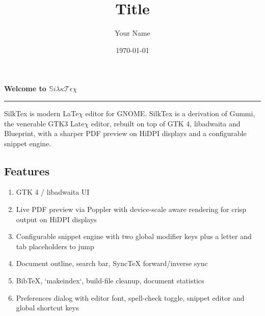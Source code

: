 \documentclass[11pt]{article}
\title{Title}
\author{Your Name}
\date{\today}
\def\horizontalline{%
\vspace{-12pt}
\begin{center}
\rule{0.7\linewidth}{0.5pt}
\end{center}
\vspace{12pt}
}
\begin{document}

{\centerline{\Large{\bf Welcome to $\mathbb{S}i\lambda \kappa \mathcal{T} \epsilon \chi$ }}}
\horizontalline


SilkTex is  modern LaTe$\chi$ editor for GNOME. SilkTex is a derivation of
Gummi, the venerable GTK3 Late$\chi$ editor, rebuilt on top of GTK 4,
libadwaita and Blueprint, with a sharper PDF preview on HiDPI displays and
a configurable snippet engine.

\subsection*{Features}

\begin{enumerate}[label=(\roman*)]
\item[$\bullet$]  GTK 4 / libadwaita UI
\item[$\bullet$] Live PDF preview via Poppler with device-scale aware rendering for
  crisp output on HiDPI displays
\item[$\bullet$]  Configurable snippet engine with two global modifier keys plus a letter and tab placeholders to jump
\item[$\bullet$]  Document outline, search bar, SyncTeX forward/inverse sync
\item[$\bullet$]  BibTeX, `makeindex`, build-file cleanup, document statistics
\item[$\bullet$]  Preferences dialog with editor font, spell-check toggle, snippet editor
  and global shortcut keys
\end{enumerate}

\thispagestyle{empty}
\end{document}
